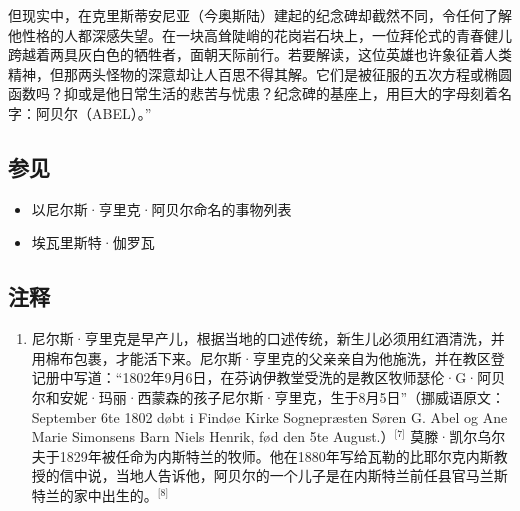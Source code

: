 但现实中，在克里斯蒂安尼亚（今奥斯陆）建起的纪念碑却截然不同，令任何了解他性格的人都深感失望。在一块高耸陡峭的花岗岩石块上，一位拜伦式的青春健儿跨越着两具灰白色的牺牲者，面朝天际前行。若要解读，这位英雄也许象征着人类精神，但那两头怪物的深意却让人百思不得其解。它们是被征服的五次方程或椭圆函数吗？抑或是他日常生活的悲苦与忧患？纪念碑的基座上，用巨大的字母刻着名字：阿贝尔（ABEL）。”
\subsection{参见}
\begin{itemize}
\item 以尼尔斯·亨里克·阿贝尔命名的事物列表
\item 埃瓦里斯特·伽罗瓦
\end{itemize}
\subsection{注释}
\begin{enumerate}
\item 尼尔斯·亨里克是早产儿，根据当地的口述传统，新生儿必须用红酒清洗，并用棉布包裹，才能活下来。尼尔斯·亨里克的父亲亲自为他施洗，并在教区登记册中写道：“1802年9月6日，在芬讷伊教堂受洗的是教区牧师瑟伦·G·阿贝尔和安妮·玛丽·西蒙森的孩子尼尔斯·亨里克，生于8月5日”（挪威语原文：September 6te 1802 døbt i Findøe Kirke Sognepræsten Søren G. Abel og Ane Marie Simonsens Barn Niels Henrik, fød den 5te August.）\(^\text{[7]}\)
莫滕·凯尔乌尔夫于1829年被任命为内斯特兰的牧师。他在1880年写给瓦勒的比耶尔克内斯教授的信中说，当地人告诉他，阿贝尔的一个儿子是在内斯特兰前任县官马兰斯特兰的家中出生的。\(^\text{[8]}\)
\end{enumerate}
